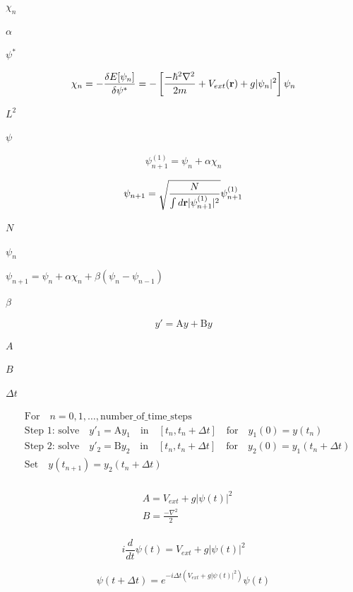 \documentclass{article}
\begin{document}
$ \chi_n $
\pagebreak

$ \alpha $
\pagebreak

$ \psi^* $
\pagebreak

\[

\chi_n = - \frac{\delta E[\psi_n]}{\delta \psi^*} =
- \left[ \frac{-\hbar^2\nabla^2}{2m}+V_{ext}({\bf r})+g|\psi_n|^2 \right] \psi_n

\]
\pagebreak

$ L^2 $
\pagebreak

$ \psi $
\pagebreak

\[
 \psi_{n+1}^{(1)} = \psi_n + \alpha \chi_n
\]
\pagebreak

\[
\psi_{n+1} = \sqrt{\frac{N}{\int d{\bf r}|\psi_{n+1}^{(1)}|^2}}\psi_{n+1}^{(1)}
\]
\pagebreak

$ N $
\pagebreak

$ {\psi_n} $
\pagebreak

$ \psi_{n+1} = \psi_n + \alpha \chi_n + \beta(\psi_n-\psi_{n-1}) $
\pagebreak

$ \beta $
\pagebreak

\[
y' = \text{A} y + \text{B} y
\]
\pagebreak

$ A $
\pagebreak

$ B $
\pagebreak

$ \Delta t $
\pagebreak

\[
\begin{align}
& \text{For}   \quad n=0,1,\dots,\text{number_of_time_steps} \nonumber \\
& \text{Step 1: solve} \quad y'_1 = \text{A}y_1 \quad \text{in} \quad [t_n,t_n+\Delta t]
\quad \text{for} \quad y_1(0)=y(t_n) \nonumber \\
& \text{Step 2: solve} \quad y'_2 = \text{B}y_2 \quad \text{in} \quad [t_n,t_n+\Delta t]
\quad \text{for} \quad y_2(0)=y_1(t_n+\Delta t) \nonumber \\
& \text{Set} \quad y(t_{n+1}) = y_2(t_n+\Delta t) \nonumber \\
\end{align}
\]
\pagebreak

\[
\begin{align}
 & A = V_{ext} + g |\psi(t)|^2 \nonumber \\
 & B = \frac{-\nabla^2}{2} \nonumber \\
\end{align}
\]
\pagebreak

\[
 i\frac{d}{dt}\psi(t) = V_{ext} + g |\psi(t)|^2
\]
\pagebreak

\[
\psi(t+\Delta t) = e^{-i\Delta t\left( V_{ext} + g |\psi(t)|^2 \right)}\psi(t)
\]
\pagebreak
\end{document}
